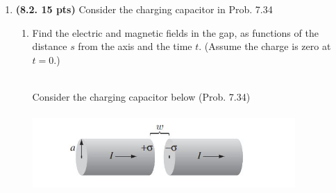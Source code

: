 \documentclass[fleqn]{article}
\begin{document}
  \begin{enumerate}
    \item \textbf{(8.2. 15 pts)} Consider the charging capacitor in Prob. 7.34
    \begin{enumerate}
      \item Find the electric and magnetic fields in the gap, as functions of the distance $s$
      from the axis and the time $t$. (Assume the charge is zero at $t=0$.)

        \textcolor{hwColor}{
          \\
          Consider the charging capacitor below (Prob. 7.34)
        }

        \begin{center}
          \includegraphics[height=3cm, width=10cm]{problem734.JPG}
        \end{center}


\end{enumerate}
\end{enumerate}
\end{document}
